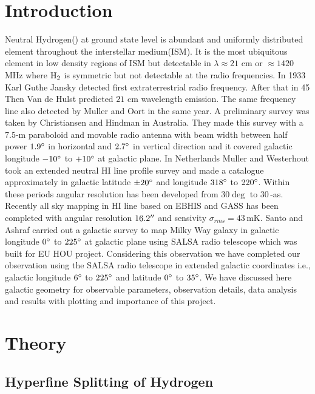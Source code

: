 \documentclass[fleqn,usenatbib]{mnras}
\begin{document}
\section{Introduction}
Neutral Hydrogen() at ground state level is abundant and uniformly distributed element throughout the interstellar medium(ISM). It is the most ubiquitous element in low density regions of ISM but detectable in $\lambda\approx21$ cm or $\approx1420$ MHz where $\textnormal{H}_2$ is symmetric but not detectable at the radio frequencies. In 1933 Karl Guthe Jansky detected first extraterrestrial radio frequency\citep{jansky1933radio}. After that in 45 Then Van de Hulst predicted $21$ cm wavelength emission\citep{CJBakker1945}. The same frequency line also detected by Muller and Oort\citep{muller1951observation} in the same year. A preliminary survey was taken by Christiansen and Hindman\citep{christiansen1952preliminary} in Australia. They made this survey with a $7.5$\textnormal{-m} paraboloid and movable radio antenna with beam width between half power $1.9\hbox{$^\circ$}$ in horizontal and $2.7\hbox{$^\circ$}$ in vertical direction and it covered galactic longitude $-10\hbox{$^\circ$}$ to $+10\hbox{$^\circ$}$ at galactic plane. In Netherlands Muller and Westerhout\citep{Muller1957} took an extended neutral HI line profile survey and made a catalogue approximately in galactic latitude $\pm20\hbox{$^\circ$}$ and longitude $318\hbox{$^\circ$}$ to $220\hbox{$^\circ$}$. Within these periods angular resolution has been developed from $30\deg$ to $30$\,-\micro as\citep{kellermann2001development,Middelberg2008}. Recently all sky mapping in HI line based on EBHIS and GASS has been completed\citep{bekhti2016hi4pi} with angular resolution $16.2\hbox{$^{\prime\prime}$}$ and sensivity $\sigma_{rms}=43$\,mK. Santo and Ashraf\citep{santo2013mapping} carried out a galactic survey to map Milky Way galaxy in galactic longitude $0\hbox{$^\circ$}$ to $225\hbox{$^\circ$}$ at galactic plane using SALSA radio telescope which was built for EU HOU project\citep{Doran2007}. Considering this observation we have completed our observation using the SALSA radio telescope in extended galactic coordinates i.e., galactic longitude $6\hbox{$^\circ$}$ to $225\hbox{$^\circ$}$ and latitude $0\hbox{$^\circ$}$ to $35\hbox{$^\circ$}$. We have discussed here galactic geometry for observable parameters, observation details, data analysis and results with plotting and importance of this project.

\section{Theory}

\subsection{Hyperfine Splitting of Hydrogen}
\end{document}
